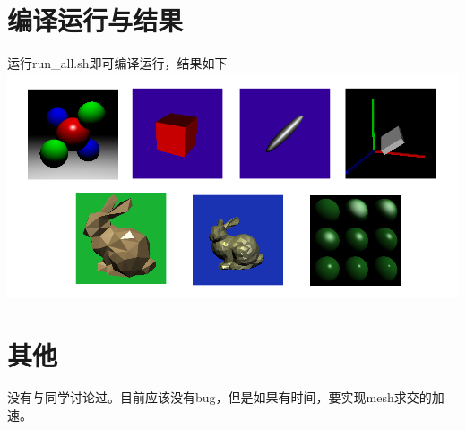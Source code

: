 \documentclass{article}
\begin{document}
\section{编译运行与结果}
运行run\_all.sh即可编译运行，结果如下\\
\includegraphics[width=\textwidth]{result.png}

\section{其他}
没有与同学讨论过。目前应该没有bug，但是如果有时间，要实现mesh求交的加速。
\end{document}
